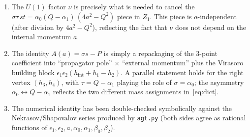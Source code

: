 \documentclass[11pt]{article}
\begin{document}
\begin{enumerate}
\item The $U(1)$ factor $\nu$ is precisely what is needed to cancel the
$\sigma\tau\,st=\alpha_0(Q-\alpha_1)\,(4a^2-Q^2)$ piece in $Z_1$. This piece is
$a$-independent (after division by $4a^2-Q^2$), reflecting the fact that $\nu$
does not depend on the internal momentum $a$.
\item The identity $A(a)=\sigma s-P$ is simply a repackaging of the
3-point coefficient into ``propagator pole'' $\times$ ``external momentum'' plus
the Virasoro building block $\epsilon_1\epsilon_2(h_{\mathrm{int}}+h_1-h_2)$.
A parallel statement holds for the right vertex $(h_3,h_4)$, with
$\tau=Q-\alpha_1$ playing the role of $\sigma=\alpha_0$; the asymmetry
$\alpha_0\leftrightarrow Q-\alpha_1$ reflects the two different mass
assignments in~\eqref{eq:dict}.
\item The numerical identity has been double-checked symbolically against the
Nekrasov/Shapovalov series produced by \texttt{agt.py} (both sides agree as
rational functions of $\epsilon_1,\epsilon_2,a,\alpha_0,\alpha_1,\beta_0,\beta_2$).
\end{enumerate}
\end{document}
